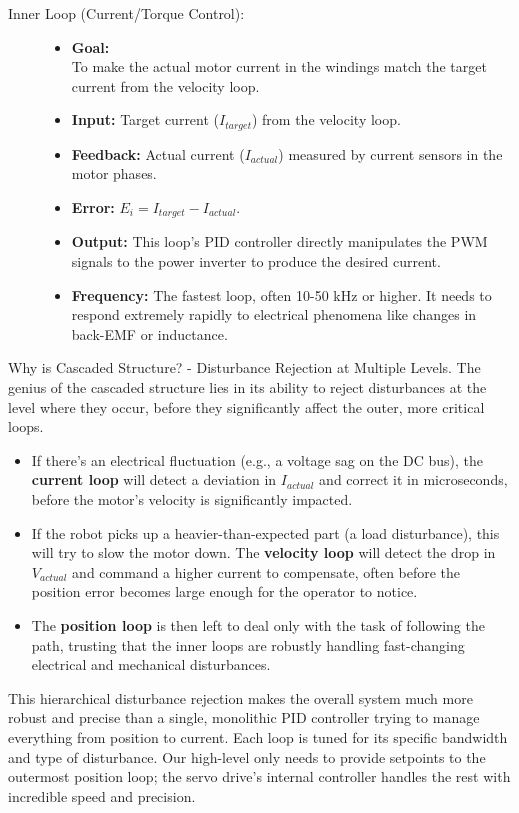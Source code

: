 \begin{description}
    \item[Inner Loop (Current/Torque Control):]
    \begin{itemize}
        \item \textbf{Goal:} \\To make the actual motor current in the windings match the target current from the velocity loop.
        \item \textbf{Input:} Target current (\(I_{target}\)) from the velocity loop.
        \item \textbf{Feedback:} Actual current (\(I_{actual}\)) measured by current sensors in the motor phases.
        \item \textbf{Error:} \(E_i = I_{target} - I_{actual}\).
        \item \textbf{Output:} This loop's PID controller directly manipulates the PWM signals to the power inverter to produce the desired current.
        \item \textbf{Frequency:} The fastest loop, often 10-50 kHz or higher. It needs to respond extremely rapidly to electrical phenomena like changes in back-EMF or inductance.
    \end{itemize}
\end{description}

\begin{principlebox}{Why is Cascaded Structure? - Disturbance Rejection at Multiple Levels.}
    The genius of the cascaded structure lies in its ability to reject disturbances at the level where they occur, before they significantly affect the outer, more critical loops.
    \begin{itemize}
        \item If there's an electrical fluctuation (e.g., a voltage sag on the DC bus), the \textbf{current loop} will detect a deviation in \(I_{actual}\) and correct it in microseconds, before the motor's velocity is significantly impacted.
        \item If the robot picks up a heavier-than-expected part (a load disturbance), this will try to slow the motor down. The \textbf{velocity loop} will detect the drop in \(V_{actual}\) and command a higher current to compensate, often before the position error becomes large enough for the operator to notice.
        \item The \textbf{position loop} is then left to deal only with the task of following the path, trusting that the inner loops are robustly handling fast-changing electrical and mechanical disturbances.
    \end{itemize}
    This hierarchical disturbance rejection makes the overall system much more robust and precise than a single, monolithic PID controller trying to manage everything from position to current. Each loop is tuned for its specific bandwidth and type of disturbance. Our high-level  only needs to provide setpoints to the outermost position loop; the servo drive's internal controller handles the rest with incredible speed and precision.
\end{principlebox}

